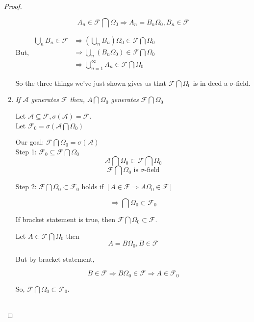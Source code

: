 \documentclass[11pt,fleqn]{book} %
\begin{document}
\begin{proof}
\begin{enumerate}[label = (\roman*)]
			$$A_n \in \mathcal{F} \bigcap \Omega_0 \Rightarrow A_n = B_n \Omega_0, B_n \in \mathcal{F} $$

			But, 
				$\begin{aligned}
					\bigcup_n B_n \in \mathcal{F} &\Rightarrow (\bigcup_n B_n)\Omega_0 \in \mathcal{F} \bigcap \Omega_0\\
					&\Rightarrow \bigcup_n (B_n\Omega_0) \in \mathcal{F} \bigcap \Omega_0\\
					&\Rightarrow \bigcup^\infty_{n=1} A_n \in \mathcal{F} \bigcap \Omega_0 
				\end{aligned} $

		So the three things we've just shown gives us that $\mathcal{F} \bigcap \Omega_0$ is in deed a $\sigma$-field.
					



		\item \textit{If $\mathcal{A}$ generates $\mathcal{F}$ then, $A \bigcap \Omega_0$ generates $\mathcal{F} \bigcap \Omega_0$}

			Let $\mathcal{A} \subseteq \mathcal{F}, \sigma(\mathcal{A}) = \mathcal{F}$.\\
			Let $\mathcal{F}_0 = \sigma(\mathcal{A} \bigcap \Omega_0)$

			Our goal: $\mathcal{F} \bigcap \Omega_0 = \sigma(\mathcal{A})$\\

			Step 1: $\mathcal{F}_0 \subseteq \mathcal{F} \bigcap \Omega_0$\\

				$$\mathcal{A} \bigcap \Omega_0 \subset \mathcal{F} \bigcap \Omega_0$$
				$$\mathcal{F} \bigcap \Omega_0 \text{ is }\sigma\text{-field} $$

			Step 2: $\mathcal{F} \bigcap \Omega_0 \subset \mathcal{F}_0$ holds if $[A \in \mathcal{F} \Rightarrow A \Omega_0 \in \mathcal{F}]$

				$$\Rightarrow \bigcap \Omega_0 \subset \mathcal{F}_0$$

				If bracket statement is true, then $\mathcal{F} \bigcap \Omega_0 \subset \mathcal{F}$.

				Let $A \in \mathcal{F} \bigcap \Omega_0$ then 
				$$A = B \Omega_0, B \in \mathcal{F} $$

				But by bracket statement, 

				$$B \in \mathcal{F} \Rightarrow B\Omega_0 \in \mathcal{F} \Rightarrow A \in \mathcal{F}_0$$

				So, $\mathcal{F} \bigcap \Omega_0 \subset \mathcal{F}_0$.\\
				\\


\end{enumerate}
\end{proof}
\end{document}
